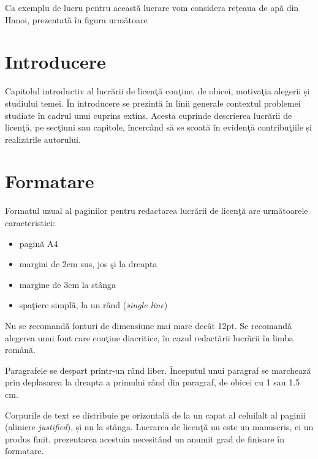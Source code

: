 Ca exemplu de lucru pentru această lucrare vom considera rețeaua de apă din Hanoi, prezentată în figura următoare  

\section{Introducere}

	Capitolul introductiv al lucrării de licenţă conţine, de obicei, motivaţia alegerii și studiului temei. În introducere se prezintă în linii generale contextul problemei studiate în cadrul unui cuprins extins. Acesta cuprinde descrierea lucrării de licenţă, pe secţiuni sau capitole, încercând să se scoată în evidenţă contribuţiile și realizările autorului.


\section{Formatare}

Formatul uzual al paginilor pentru redactarea lucrării de licenţă are următoarele caracteristici:

\begin{itemize}
\item pagină A4
\item 	margini de 2cm sus, jos \c si la dreapta
\item  margine de 3cm la stânga
\item spaţiere simplă, la un rând (\emph{single line})
\end{itemize}


Nu se recomandă fonturi de dimensiune mai mare decât 12pt. Se recomandă alegerea unui font care conţine diacritice, în cazul redactării lucrării în limba română.

Paragrafele se despart printr-un rând liber. Începutul unui paragraf se marchează prin deplasarea la dreapta a primului rând din paragraf, de obicei cu 1 sau 1.5 cm.

Corpurile de text se distribuie pe orizontală de la un capat al celuilalt al paginii (aliniere \emph{justified}), și nu la stânga. Lucrarea de licenţă nu este un manuscris, ci un produs finit, prezentarea acestuia necesitând un anumit grad de finisare în formatare.

